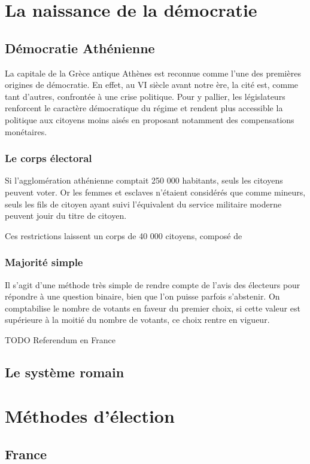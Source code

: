 \documentclass[12pt,a4paper]{report}
\begin{document}
\chapter{La naissance de la démocratie}

\section{Démocratie Athénienne}
La capitale de la Grèce antique Athènes est reconnue comme l'une des premières origines de démocratie. 
En effet, au VI siècle avant notre ère, la cité est, comme tant d'autres, confrontée à une crise politique. 
Pour y pallier, les législateurs renforcent le caractère démocratique du régime et rendent plus accessible la politique aux citoyens moins aisés en proposant notamment des compensations monétaires.

\subsection{Le corps électoral}
Si l'agglomération athénienne comptait 250 000 habitants\nocite{persee:popu}, seuls les citoyens peuvent voter. 
Or les femmes et esclaves n'étaient considérés que comme mineurs, seuls les fils de citoyen ayant suivi l'équivalent du service militaire moderne peuvent jouir du titre de citoyen.

Ces restrictions laissent un corps de 40 000 citoyens, composé de

\nocite{wiki:histdemo}
\subsection{Majorité simple} %
Il s'agit d'une méthode très simple de rendre compte de l'avis des électeurs pour répondre à une question binaire, bien que l'on puisse parfois s'abstenir.
On comptabilise le nombre de votants en faveur du premier choix, si cette valeur est supérieure à la moitié du nombre de votants, ce choix rentre en vigueur.


TODO Referendum en France

\section{Le système romain}

\chapter{Méthodes d'élection}
\section{France} %
\end{document}
